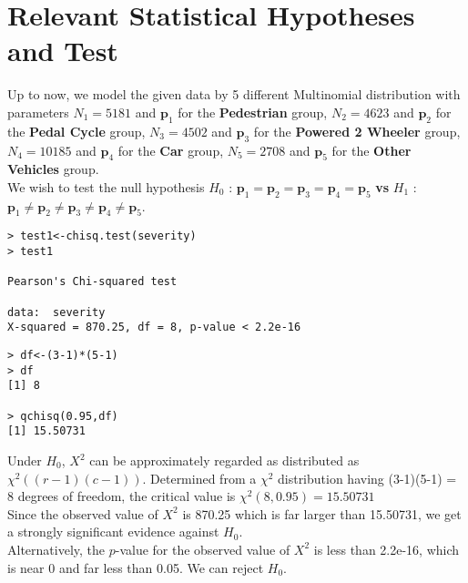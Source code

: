 \documentclass[12pt]{article}
\begin{document}
\section{Relevant Statistical Hypotheses and Test}
Up to now, we model the given data by 5 different Multinomial distribution with parameters $N_1=5181$ and $\textbf{p}_1$ for the \textbf{Pedestrian} group, $N_2=4623$ and $\textbf{p}_2$ for the \textbf{Pedal Cycle} group, $N_3=4502$ and $\textbf{p}_3$ for the \textbf{Powered 2 Wheeler} group, $N_4=10185$ and $\textbf{p}_4$ for the \textbf{Car} group, $N_5=2708$ and $\textbf{p}_5$ for the \textbf{Other Vehicles} group.\\[7pt]
We wish to test the null hypothesis $H_0$ : $\textbf{p}_1=\textbf{p}_2=\textbf{p}_3=\textbf{p}_4=\textbf{p}_5$   \textbf{vs}  $H_1$ : $\textbf{p}_1\not=\textbf{p}_2\not=\textbf{p}_3\not=\textbf{p}_4\not=\textbf{p}_5$. 
\begin{verbatim}
> test1<-chisq.test(severity)
> test1

Pearson's Chi-squared test

data:  severity
X-squared = 870.25, df = 8, p-value < 2.2e-16
\end{verbatim}    
\begin{verbatim}
> df<-(3-1)*(5-1)
> df
[1] 8

> qchisq(0.95,df)
[1] 15.50731
\end{verbatim}
Under $H_0$, $X^2$ can be approximately regarded as distributed as $\chi^2((r-1)(c-1))$. Determined from a $\chi^2$ distribution having (3-1)(5-1) = 8 degrees of freedom, the critical value is $\chi^2(8,0.95) = 15.50731$\\[7pt]
Since the observed value of $X^2$ is 870.25 which is far larger than 15.50731, we get a strongly significant evidence against $H_0$.\\[7pt]
Alternatively, the $p$-value for the observed value of $X^2$ is less than 2.2e-16, which is near 0 and far less than 0.05. We can reject $H_0$.\\[7pt]


\newpage
\end{document}
